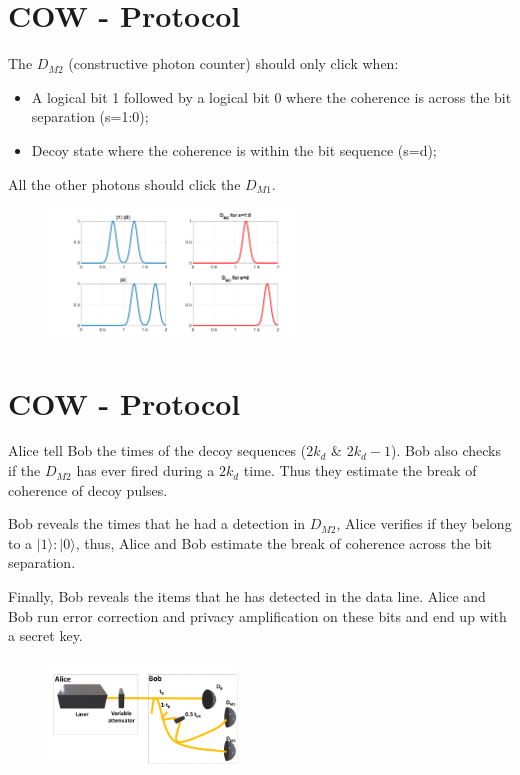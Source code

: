 \documentclass[1000pt]{article}
\newcommand{\mysection}[1]{\section*{\color{black}\sffamily #1}}%
\begin{document}

\mysection{\Huge COW - Protocol}\Large
The $D_{M2}$ (constructive photon counter) should only click when:
\begin{itemize}
\item A logical bit 1 followed by a logical bit 0 where the coherence is across the bit separation (s=1:0);
\item Decoy state where the coherence is within the bit sequence (s=d);
\end{itemize}
All the other photons should click the $D_{M1}$.
  \begin{figure}[hbt]
    	\centering
    	\includegraphics[width=0.6\textwidth]{./figures/Simple2.png}
        	\label{Simple2}
    \end{figure}

\mysection{\Huge COW - Protocol}\Large
\begin{description}
\vspace{15mm}
\item [Step 3] Alice tell Bob the times of the decoy sequences ($2k_d$  \& $ 2k_d-1$). Bob also checks if the $D_{M2}$ has ever fired during a $2k_d$ time. Thus they estimate the break of coherence of decoy pulses.
\vspace{3mm}
\item [Step 4] Bob reveals the times that he had a detection in $D_{M2}$, Alice verifies if they belong to a $|1\rangle:|0\rangle$, thus, Alice and Bob estimate the break of coherence across the bit separation.
\vspace{3mm}
\item [Step 5] Finally, Bob reveals the items that he has detected in the data line. Alice and Bob run error correction and privacy amplification on these bits and end up with a secret key.
  \begin{figure}[hbt]
    	\centering
    	\includegraphics[width=0.45\textwidth]{./figures/Full2.pdf}
        	\label{Simple2}
    \end{figure}
\end{description}
\end{document}

